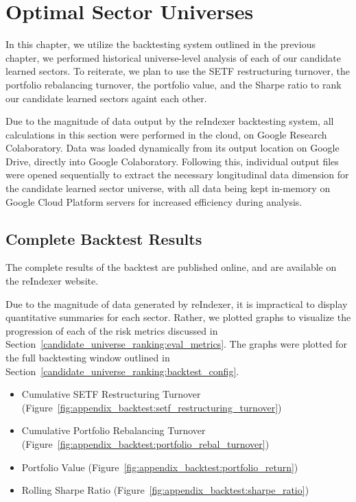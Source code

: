 \documentclass[../main.tex]{subfiles}
\begin{document}
    
\chapter{Optimal Sector Universes} \label{optimal_sector_universes}


In this chapter, we utilize the backtesting system outlined in the previous chapter, we performed historical universe-level analysis of each of our candidate learned sectors. To reiterate, we plan to use the SETF restructuring turnover, the portfolio rebalancing turnover, the portfolio value, and the Sharpe ratio to rank our candidate learned sectors againt each other.

Due to the magnitude of data output by the reIndexer backtesting system, all calculations in this section were performed in the cloud, on Google Research Colaboratory. Data was loaded dynamically from its output location on Google Drive, directly into Google Colaboratory. Following this, individual output files were opened sequentially to extract the necessary longitudinal data dimension for the candidate learned sector universe, with all data being kept in-memory on Google Cloud Platform servers for increased efficiency during analysis.

\section{Complete Backtest Results}

The complete results of the backtest are published online, and are available on the reIndexer website.

Due to the magnitude of data generated by reIndexer, it is impractical to display quantitative summaries for each sector. Rather, we plotted graphs to visualize the progression of each of the risk metrics discussed in Section~\ref{candidate_universe_ranking:eval_metrics}. The graphs were plotted for the full backtesting window outlined in Section~\ref{candidate_universe_ranking:backtest_config}.

\begin{itemize}
    \item Cumulative SETF Restructuring Turnover (Figure~\ref{fig:appendix_backtest:setf_restructuring_turnover})
    \item Cumulative Portfolio Rebalancing Turnover (Figure~\ref{fig:appendix_backtest:portfolio_rebal_turnover})
    \item Portfolio Value (Figure~\ref{fig:appendix_backtest:portfolio_return})
    \item Rolling Sharpe Ratio (Figure~\ref{fig:appendix_backtest:sharpe_ratio})
\end{itemize}
\end{document}
